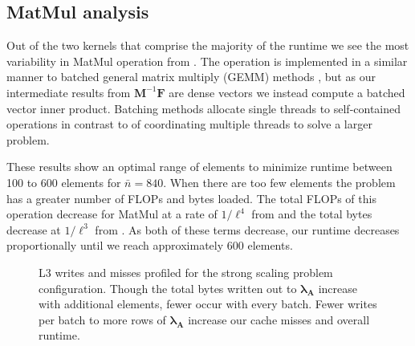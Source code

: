 %
%
%
\subsection{MatMul analysis}

%
%
%


%
%
%
Out of the two kernels that comprise the majority of the runtime we see the most variability in MatMul operation from . 
The operation is implemented in a similar manner to batched general matrix multiply (GEMM) methods \citep{wei2022lbbgemm}, but as our intermediate results from $\textbf{M}^{-1}\textbf{F}$ are dense vectors we instead compute a batched vector inner product. Batching methods allocate single threads to self-contained operations in contrast to  of coordinating multiple threads to solve a larger problem. 

These results show an optimal range of elements to minimize runtime between 100 to 600 elements for $\bar{n} = 840$.
When there are too few elements the problem has a greater number of FLOPs and bytes loaded. 
The total FLOPs of this operation decrease for MatMul at a rate of $1/\ell^4$ from  and the total bytes decrease at $1/\ell^3$ from .
As both of these terms decrease, our runtime decreases proportionally until we reach approximately 600 elements. 


\begin{figure}
	 
	\caption{L3 writes and misses profiled for the strong scaling problem configuration. 
	Though the total bytes written out to $\symbf{\lambda}_{\textbf{A}}$ increase with additional elements, fewer occur with every batch. 
	Fewer writes per batch to more rows of $\symbf{\lambda}_{\textbf{A}}$ increase our cache misses and overall runtime.
	}
	\label{fig:mmwm}
\end{figure}







